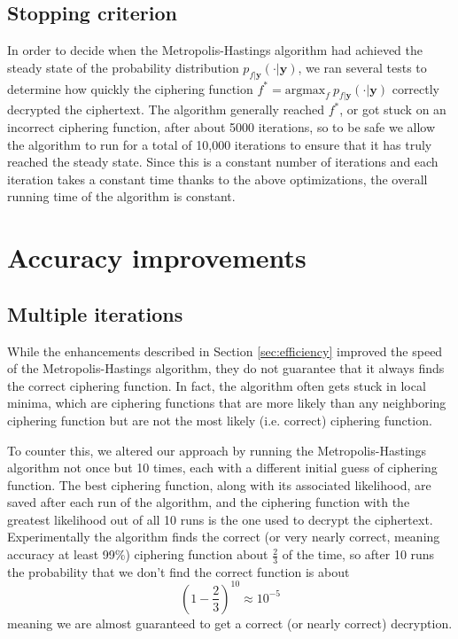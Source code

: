\documentclass{article}
\begin{document}
\subsection{Stopping criterion}

In order to decide when the Metropolis-Hastings algorithm had achieved the steady state of the probability distribution $p_{f|\mathbf{y}}(\cdot|\mathbf{y})$, we ran several tests to determine how quickly the ciphering function $f^* = \textrm{argmax}_f\ p_{f|\mathbf{y}}(\cdot|\mathbf{y})$ correctly decrypted the ciphertext. The algorithm generally reached $f^*$, or got stuck on an incorrect ciphering function, after about 5000 iterations, so to be safe we allow the algorithm to run for a total of 10,000 iterations to ensure that it has truly reached the steady state. Since this is a constant number of iterations and each iteration takes a constant time thanks to the above optimizations, the overall running time of the algorithm is constant.

\section{Accuracy improvements}\label{sec:accuracy}

\subsection{Multiple iterations}

While the enhancements described in Section \ref{sec:efficiency} improved the speed of the Metropolis-Hastings algorithm, they do not guarantee that it always finds the correct ciphering function. In fact, the algorithm often gets stuck in local minima, which are ciphering functions that are more likely than any neighboring ciphering function but are not the most likely (i.e. correct) ciphering function.

To counter this, we altered our approach by running the Metropolis-Hastings algorithm not once but 10 times, each with a different initial guess of ciphering function. The best ciphering function, along with its associated likelihood, are saved after each run of the algorithm, and the ciphering function with the greatest likelihood out of all 10 runs is the one used to decrypt the ciphertext. Experimentally the algorithm finds the correct (or very nearly correct, meaning accuracy at least 99\%) ciphering function about $\frac{2}{3}$ of the time, so after 10 runs the probability that we don't find the correct function is about $$\left( 1 - \frac{2}{3} \right)^{10} \approx 10^{-5}$$ meaning we are almost guaranteed to get a correct (or nearly correct) decryption.
\end{document}
